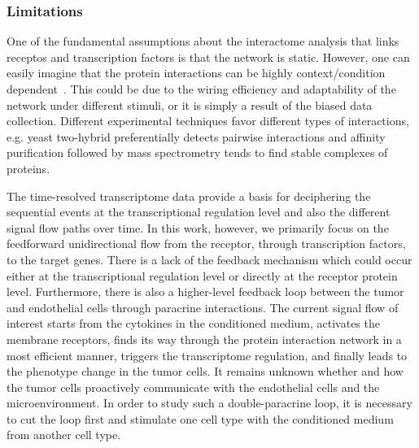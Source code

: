 
\subsubsection{Limitations}

One of the fundamental assumptions about the interactome analysis that links receptos
and transcription factors is that the network is static. However, one can 
easily imagine that the protein interactions can be highly context/condition
dependent~\citep{Przytycka2010b,Schaefer2013}. This could be due to the wiring efficiency
and adaptability of the network under different stimuli, or it is simply 
a result of the biased data collection. Different experimental
techniques favor different types of interactions, e.g. yeast two-hybrid 
preferentially detects pairwise interactions and affinity purification
followed by mass spectrometry tends to find stable complexes of proteins.

The time-resolved transcriptome data provide a basis for deciphering the
sequential events at the transcriptional regulation level and also the 
different signal flow paths over time. In this work, however, we primarily
focus on the feedforward unidirectional flow from the receptor, through
transcription factors, to the target genes. There is a lack of the 
feedback mechanism which could occur either at the transcriptional
regulation level or directly at the receptor protein level. 
Furthermore, there is also a higher-level feedback loop
between the tumor and endothelial cells through paracrine 
interactions. The current signal flow of interest starts 
from the
cytokines in the conditioned medium, activates the membrane
receptors, finds its way through the protein interaction
network in a most efficient manner, triggers the 
transcriptome regulation, and finally leads to the phenotype
change in the tumor cells. It remains unknown whether and how
the tumor cells proactively communicate with the 
endothelial cells and the microenvironment. In order to
study such a double-paracrine loop, it is necessary to cut
the loop first and stimulate one cell type with the 
conditioned medium from another cell type.

